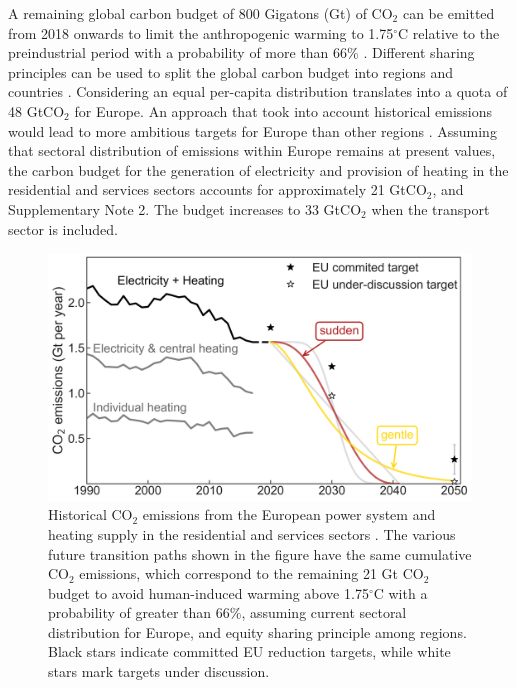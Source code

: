 \documentclass[5p]{elsarticle} %
\begin{document}
A remaining global carbon budget of 800 Gigatons (Gt) of CO$_2$ can be emitted from 2018 onwards to limit the anthropogenic warming to 1.75$^{\circ}$C relative to the preindustrial period with a probability of more than 66\% \cite{IPCC_1.5}. Different sharing principles can be used to split the global carbon budget into regions and countries \cite{Raupach_2014}. Considering an equal per-capita distribution translates into a quota of 48 GtCO$_2$ for Europe. An approach that took into account historical emissions would lead to more ambitious targets for Europe than other regions \cite{Matthews_2016}. Assuming that sectoral distribution of emissions within Europe remains at present values, the carbon budget for the generation of electricity and provision of heating in the residential and services sectors accounts for approximately 21 GtCO$_2$, \cite{UNFCCC_inventory} and Supplementary Note 2. The budget increases to 33 GtCO$_2$ when the transport sector is included. \\ 

\begin{figure}[!h]
\centering
	\includegraphics[width=\columnwidth]{figures/carbon_budget.png}
\caption{Historical CO$_2$ emissions from the European power system and heating supply in the residential and services sectors \cite{UNFCCC_inventory}. The various future transition paths shown in the figure have the same cumulative CO$_2$ emissions, which correspond to the remaining 21 Gt CO$_2$ budget to avoid human-induced warming above 1.75$^{\circ}$C with a probability of greater than 66\%, assuming current sectoral distribution for Europe, and equity sharing principle among regions. Black stars indicate committed EU reduction targets, while white stars mark targets under discussion.} \label{fig_carbon_budget} 
\end{figure}
\end{document}
